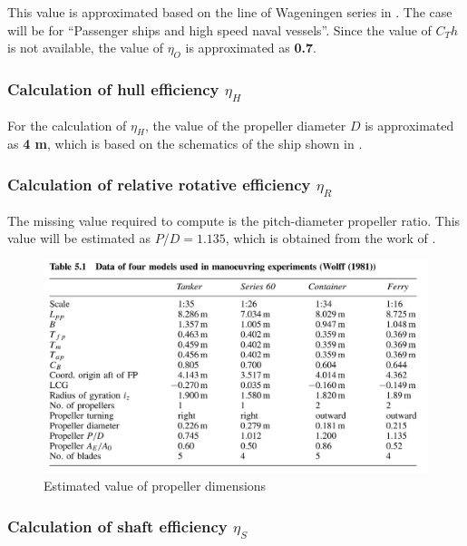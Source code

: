 This value is approximated based on the line of Wageningen series in  . The case will be for ``Passenger ships and high speed naval vessels''. Since the value of $C_Th$ is not available, the value of $\eta_O$ is approximated as \textbf{0.7}.

\subsubsection*{Calculation of hull efficiency $\eta_H$}

For the calculation of $\eta_H$, the value of the propeller diameter $D$ is approximated as \textbf{4 m}, which is based on the schematics of the ship shown in .

\subsubsection*{Calculation of relative rotative efficiency $\eta_R$}

The missing value required to compute  is the pitch-diameter propeller ratio. This value will be estimated as $P/D = 1.135$, which is obtained from the work of .

\begin{figure}[h]
    \centering
        \includegraphics[width=.95\textwidth]{02_figures/betram_wolff_ratiomodel .jpg}
        \caption{Estimated value of propeller dimensions}
        \label{fig:betram_wolff_propellerdimensions}
\end{figure}

\subsubsection*{Calculation of shaft efficiency $\eta_S$}

